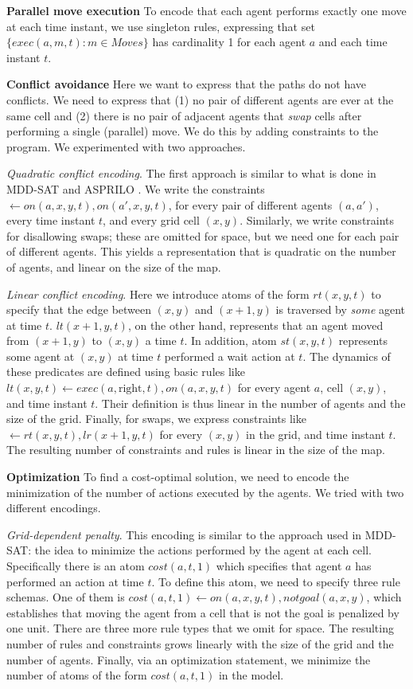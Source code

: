 \documentclass[letterpaper]{article} %
\begin{document}
\noindent\textbf{Parallel move execution} To encode that each agent performs exactly one move at each time instant, we use singleton rules, expressing that set $\{exec(a,m,t):m\in Moves\}$ has cardinality 1 for each agent $a$ and each time instant $t$.

\noindent\textbf{Conflict avoidance} Here we want to express that the paths do not have conflicts. We need to express that (1) no pair of different agents are ever at the same cell and (2) there is no pair of adjacent agents that \emph{swap} cells after performing a single (parallel) move. We do this by adding constraints to the program. We experimented with two approaches.

\noindent \emph{Quadratic conflict encoding}. The first approach is similar to what is done in MDD-SAT \cite{SurynekFSB16} and ASPRILO \cite{GebserOOS18}.  We write the constraints $\leftarrow {on(a,x,y,t),on(a',x,y,t)}$, for every pair of different agents $(a,a')$, every time instant $t$, and every grid cell $(x,y)$. Similarly, we write constraints for disallowing swaps; these are omitted for space, but we need one for each pair of different agents. This yields a representation that is quadratic on the number of agents, and linear on the size of the map.

\noindent \emph{Linear conflict encoding}. Here we introduce atoms of the form $rt(x,y,t)$ to specify that the edge between $(x,y)$ and $(x+1,y)$ is traversed by \emph{some} agent at time $t$. $lt(x+1,y,t)$, on the other hand, represents that an agent moved from  $(x+1,y)$ to $(x,y)$ a time $t$. In addition, atom $st(x,y,t)$ represents some agent at $(x,y)$ at time $t$ performed a wait action at $t$. The dynamics of these predicates are defined using basic rules like $lt(x,y,t)\leftarrow exec(a,\mathrm{right},t),on(a,x,y,t)$ for every agent $a$, cell $(x,y)$, and time instant $t$. Their definition is thus linear in the number of agents and the size of the grid. Finally, for swaps, we express constraints like $\leftarrow rt(x,y,t),lr(x+1,y,t)$ for every $(x,y)$ in the grid, and time instant $t$. The resulting number of constraints and rules is linear in the size of the map.


\noindent \textbf{Optimization} To find a cost-optimal solution, we need to encode the minimization of the number of actions executed by the agents. We tried with two different encodings.

\noindent \emph{Grid-dependent penalty}. This encoding is similar to the approach used in MDD-SAT: the idea to minimize the actions performed by the agent at each cell. Specifically there is an atom $cost(a,t,1)$ which specifies that agent $a$ has performed an action at time $t$. To define this atom, we need to specify three rule schemas. One of them is $cost(a,t,1) \leftarrow on(a,x,y,t), notgoal(a,x,y)$, which establishes that moving the agent from a cell that is not the goal is penalized by one unit. There are three more rule types that we omit for space. The resulting number of rules and constraints grows linearly with the size of the grid and the number of agents. Finally, via an optimization statement, we minimize the number of atoms of the form $cost(a,t,1)$ in the model.
\end{document}
